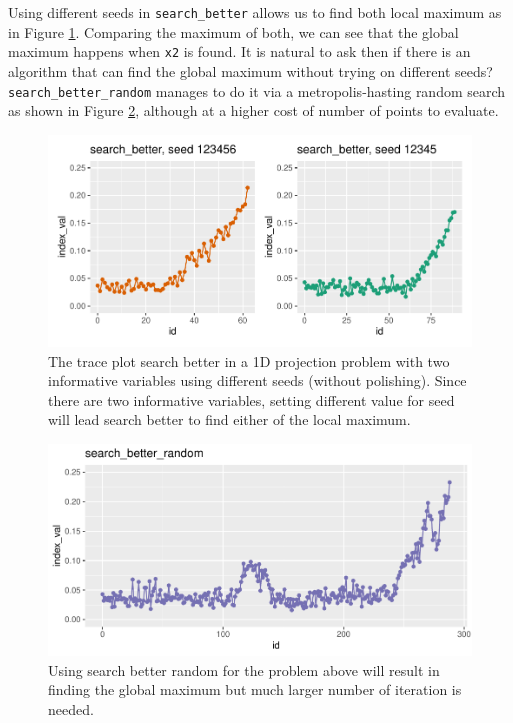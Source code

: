 \documentclass[12pt]{article}
\begin{document}
Using different seeds in \texttt{search\_better} allows us to find both
local maximum as in Figure \ref{1d-2var-different-seeds}. Comparing the
maximum of both, we can see that the global maximum happens when
\texttt{x2} is found. It is natural to ask then if there is an algorithm
that can find the global maximum without trying on different seeds?
\texttt{search\_better\_random} manages to do it via a
metropolis-hasting random search as shown in Figure
\ref{1d-2var-better-random}, although at a higher cost of number of
points to evaluate.

\begin{figure}
\centering
\includegraphics{paper_files/figure-latex/1d-2var-different-seeds-1.pdf}
\caption{\label{1d-2var-different-seeds}The trace plot search better in
a 1D projection problem with two informative variables using different
seeds (without polishing). Since there are two informative variables,
setting different value for seed will lead search better to find either
of the local maximum.}
\end{figure}

\begin{figure}
\centering
\includegraphics{paper_files/figure-latex/1d-2var-better-random-1.pdf}
\caption{\label{1d-2var-better-random}Using search better random for the
problem above will result in finding the global maximum but much larger
number of iteration is needed.}
\end{figure}
\end{document}
